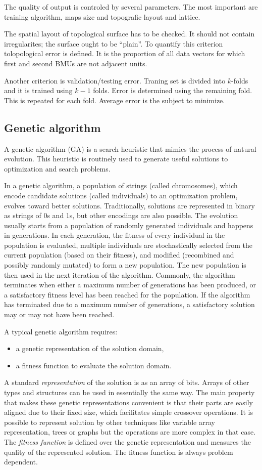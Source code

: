 \documentclass[a4paper]{IEEEtran}
\begin{document}
The quality of output is controled by several parameters. The most important are 
training algorithm, maps size and topografic layout and lattice.

The spatial 
layout of topological surface has to be checked. 
It should not contain irregularites; the surface ought to be ``plain''.
To quantify this criterion tolopological error is defined. It is the proportion 
of all data vectors for which first and second BMUs are not adjacent units.

Another criterion is validation/testing error. Traning set is divided into $ k $-folds
and it is trained using $ k-1 $ folds. Error is determined using the remaining fold. 
This is repeated for each fold.
Average error is the subject to minimize.

\subsection{Genetic algorithm}
A genetic algorithm (GA) is a search heuristic that mimics the 
process of natural evolution. This heuristic is routinely used to 
generate useful solutions to optimization and search problems.

In a genetic algorithm, a population of strings (called chromosomes), 
which encode candidate solutions (called individuals) to an optimization problem,
evolves toward better solutions.
Traditionally, solutions are represented in binary as strings of 0s and 1s, 
but other encodings are also possible. 
The evolution usually starts from a population of randomly generated individuals 
and happens in generations.
In each generation, the fitness of every individual in the population is evaluated,
multiple individuals are stochastically selected from the current population 
(based on their fitness), and modified (recombined and possibly randomly mutated) 
to form a new population. The new population is then used in the next 
iteration of the algorithm. 
Commonly, the algorithm terminates when either a maximum number of generations 
has been produced, or a satisfactory fitness level has been reached 
for the population. 
If the algorithm has terminated due to a maximum number of generations, 
a satisfactory solution may or may not have been reached.

A typical genetic algorithm requires:
\begin{itemize}
	\item a genetic representation of the solution domain,
	\item a fitness function to evaluate the solution domain.
\end{itemize}
A standard \textit{representation} of the solution is as an array of bits. 
Arrays of other types and structures can be used in essentially the same way. 
The main property that makes these genetic representations convenient 
is that their parts are easily aligned due to their fixed size,
which facilitates simple crossover operations. It is possible to 
represent solution by other techniques like variable array representation,
trees or graphs but the operations are more complex in that case.
The \textit{fitness function} is defined over the genetic representation and
measures the quality of the represented solution. The fitness function 
is always problem dependent.
\end{document}

